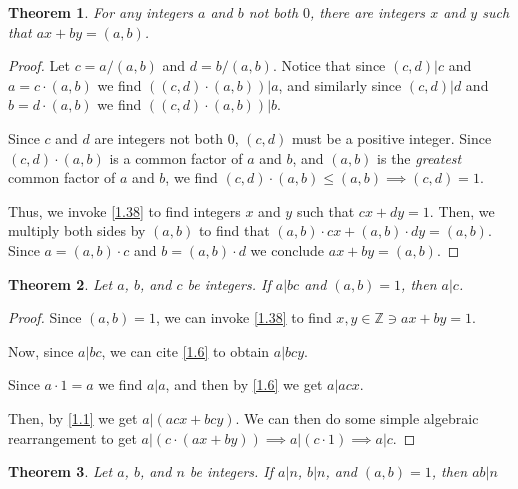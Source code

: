\documentclass{article}
\newtheorem{thm}{Theorem}[section]
\numberwithin{equation}{thm}
\begin{document}
\begin{thm} \label{1.40}
  For any integers $a$ and $b$ not both $0$, there are integers $x$ and $y$ such that $ax + by = (a, b)$.
\end{thm}

\begin{proof}
  Let $c = a / (a, b)$ and $d = b / (a, b)$. Notice that since $(c, d) | c$ and $a = c \cdot (a, b)$ we find $\left( (c, d) \cdot (a, b) \right) | a$, and similarly since $(c, d) | d$ and $b = d \cdot (a, b)$ we find $\left( (c, d) \cdot (a, b) \right) | b$.

  Since $c$ and $d$ are integers not both $0$, $(c, d)$ must be a positive integer. Since $(c, d) \cdot (a, b)$ is a common factor of $a$ and $b$, and $(a, b)$ is the \emph{greatest} common factor of $a$ and $b$, we find $(c, d) \cdot (a, b) \leq (a, b) \implies (c, d) = 1$.

  Thus, we invoke \ref{1.38} to find integers $x$ and $y$ such that $cx + dy = 1$. Then, we multiply both sides by $(a, b)$ to find that $(a, b) \cdot cx + (a, b) \cdot dy = (a, b)$. Since $a = (a, b) \cdot c$ and $b = (a, b) \cdot d$ we conclude $ax + by = (a, b)$.
\end{proof}



\pagebreak



\begin{thm} \label{1.41}
  Let $a$, $b$, and $c$ be integers. If $a|bc$ and $(a, b) = 1$, then $a|c$.
\end{thm}

\begin{proof}
  Since $(a, b) = 1$, we can invoke \ref{1.38} to find $x, y \in \mathbb{Z} \ni ax + by = 1$.

  Now, since $a | bc$, we can cite \ref{1.6} to obtain $a | bcy$.

  Since $a \cdot 1 = a$ we find $a | a$, and then by \ref{1.6} we get $a | acx$.

  Then, by \ref{1.1} we get $a | (acx + bcy)$. We can then do some simple algebraic rearrangement to get $a | \left( c \cdot (ax + by) \right) \implies a | (c \cdot 1) \implies a | c$.
\end{proof}



\begin{thm} \label{1.42}
  Let $a$, $b$, and $n$ be integers. If $a|n$, $b|n$, and $(a, b) = 1$, then $ab | n$
\end{thm}
\end{document}
